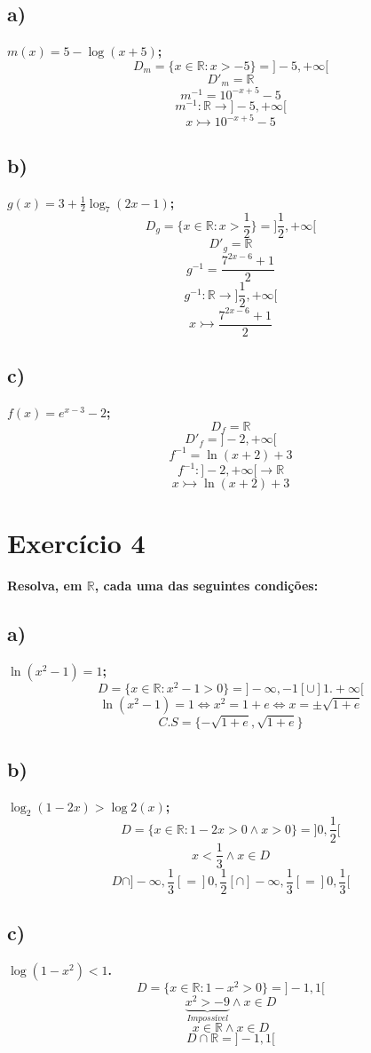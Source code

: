 \documentclass[a4paper]{article}
\begin{document}
\subsection*{a)}\textbf{$m(x)=5 -\log(x+5)$;}
\[D_{m}=\{x \in \mathbb{R}: x > -5\}=]-5,+\infty[\]
\[D'_{m}=\mathbb{R}\]
\[m^{-1}=10^{-x+5}-5\]
\[m^{-1}:\mathbb{R}\rightarrow ]-5,+\infty[\]
\[x\rightarrowtail 10^{-x+5}-5\]

\subsection*{b)}\textbf{$g(x)=3 + \frac{1}{2}\log_{7}(2x-1)$;}
\[D_{g}=\{x \in \mathbb{R}: x > \frac{1}{2}\}=]\frac{1}{2},+\infty[\]
\[D'_{g}=\mathbb{R}\]
\[g^{-1}=\frac{7^{2x-6}+1}{2}\]
\[g^{-1}:\mathbb{R}\rightarrow ]\frac{1}{2},+\infty[\]
\[x\rightarrowtail \frac{7^{2x-6}+1}{2}\]

\subsection*{c)}\textbf{$f(x)=e^{x-3}-2$;}
\[D_{f}=\mathbb{R}\]
\[D'_{f}=]-2,+\infty[\]
\[f^{-1}=\ln{\left(x+2\right)}+3\]
\[f^{-1}:]-2,+\infty[\rightarrow \mathbb{R}\]
\[x\rightarrowtail \ln{\left(x+2\right)}+3\]

\section*{Exercício 4}\textbf{Resolva, em $\mathbb{R}$, cada uma das seguintes condições:}
\subsection*{a)}\textbf{$\ln(x^2-1)=1$;}
\[D=\{x \in \mathbb{R}:x^2 - 1 > 0\}=]-\infty,-1[ \cup ]1.+\infty[\]
\[\ln(x^2-1)=1\Leftrightarrow x^2=1+e \Leftrightarrow x = \pm \sqrt{1+e}\]
\[C.S=\{-\sqrt{1+e},\sqrt{1+e}\}\]
\subsection*{b)}\textbf{$\log_{2}(1-2x) > \log{2}(x)$;}
\[D=\{x \in \mathbb{R}:1-2x > 0 \land x > 0\}=]0,\frac{1}{2}[\]
\[x < \frac{1}{3} \land x \in D\]
\[D \cap ]-\infty,\frac{1}{3}[=]0,\frac{1}{2}[ \cap ]-\infty,\frac{1}{3}[ = ]0,\frac{1}{3}[ \]

\subsection*{c)}\textbf{$\log(1-x^2) < 1$.}
\[D=\{x \in \mathbb{R}:1-x^2 > 0\}=]-1,1[\]
\[\underbrace{x^2 > -9}_{Impossível} \land x \in D\]
\[x \in \mathbb{R} \land x \in D\]
\[D \cap \mathbb{R}=]-1,1[\]
\end{document}
